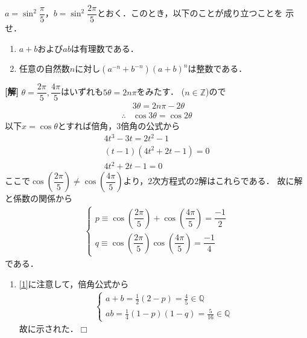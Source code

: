 \documentclass[a4j]{jarticle}
\title{}
\begin{document}

\begin{oframed}
$a=\sin^2\dfrac{\pi}{5}$，$b=\sin^2\dfrac{2\pi}{5}$とおく．このとき，以下のことが成り立つことを
示せ．
     \begin{enumerate}[(1)]
     \item $a+b$および$ab$は有理数である．
     \item 任意の自然数$n$に対し$(a^{-n}+b^{-n})(a+b)^n$は整数である．
     \end{enumerate}     
\end{oframed}

\setlength{\columnseprule}{0.4pt}
\begin{multicols}{2}
{\bf[解]}
$\theta=\dfrac{2\pi}{5},\dfrac{4\pi}{5}$はいずれも$5\theta=2n\pi$をみたす．
($n\in\mathbb{Z}$)ので
     \begin{align*}
     &3\theta=2n\pi-2\theta \\
     \therefore &\cos3\theta=\cos2\theta
     \end{align*}
以下$x=\cos\theta$とすれば倍角，$3$倍角の公式から
     \begin{align*}
     4t^3-3t=2t^2-1 \\
     (t-1)(4t^2+2t-1)=0  \\
     4t^2+2t-1=0 \tag{$\because t\not=0$}
     \end{align*}
ここで$\cos\left(\dfrac{2\pi}{5}\right)\not=\cos\left(\dfrac{4\pi}{5}\right)$より，$2$次方程式の$2$解はこれらである．
故に解と係数の関係から
     \begin{align}
     \left\{
          \begin{array}{l}
          p\equiv\cos\left(\dfrac{2\pi}{5}\right)+\cos\left(\dfrac{4\pi}{5}\right)=\dfrac{-1}{2}  \\
          q\equiv\cos\left(\dfrac{2\pi}{5}\right)\cos\left(\dfrac{4\pi}{5}\right)=\dfrac{-1}{4}
          \end{array}
     \right.     \label{1}
     \end{align}
である．     
     \begin{enumerate}[(1)]
     \item \eqref{1}に注意して，倍角公式から
          \begin{align}
          \left\{
               \begin{array}{l}
               a+b=\frac{1}{2}(2-p)=\frac{4}{5}\in\mathbb{Q} \\
               ab=\frac{1}{4}(1-p)(1-q)=\frac{5}{16}\in\mathbb{Q} 
               \end{array}
          \right.\label{2}     
          \end{align}
     故に示された．$\Box$     
     

\end{enumerate}
\end{multicols}
\end{document}
